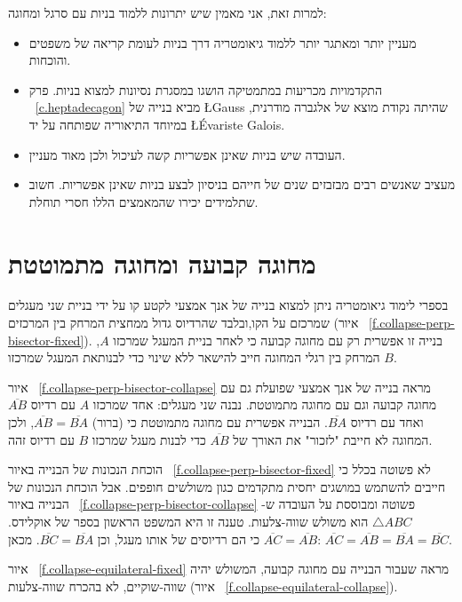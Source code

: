 למרות זאת, אני מאמין שיש יתרונות ללמוד בניות עם סרגל ומחוגה:
\begin{itemize}
\item
מעניין יותר ומאתגר יותר ללמוד גיאומטריה דרך בניות לעומת קריאה של משפטים והוכחות.
\item
התקדמויות מכריעות במתמטיקה הושגו במסגרת נסיונות למצוא בניות. פרק%
~\ref{c.heptadecagon}
מביא בנייה של 
\L{Gauss}
שהיתה נקודת מוצא של אלגברה מודרנית, במיוחד התיאוריה שפותחה על יד 
\L{\'{E}variste Galois}.
\item
העובדה שיש בניות שאינן אפשריות קשה לעיכול ולכן מאוד מעניין.
\item
מעציב שאנשים רבים מבזבזים שנים של חייהם בניסיון לבצע בניות שאינן אפשריות. חשוב שתלמידים יכירו שהמאמצים הללו חסרי תוחלת.
\end{itemize}



\section{מחוגה קבועה ומחוגה מתמוטטת}\label{s.collapse}

בספרי לימוד גיאומטריה ניתן למצוא בנייה של אנך אמצעי לקטע קו על ידי בניית שני מעגלים שמרכזם על הקו,ובלבד שהרדיוס גדול ממחצית המרחק בין המרכזים 
(איור%
~\ref{f.collapse-perp-bisector-fixed}).
בנייה זו אפשרית רק עם מחוגה קבועה כי לאחר בניית המעגל שמרכזו 
$A$,
המרחק בין רגלי המחוגה חייב להישאר ללא שינוי כדי לבנותאת המעגל שמרכזו 
$B$.

איור%
~\ref{f.collapse-perp-bisector-collapse}
מראה בנייה של אנך אמצעי שפועלת גם עם מחוגה קבועה וגם עם מחוגה מתמוטטת. נבנה שני מעגלים: אחד שמרכזו 
$A$
עם רדיוס
$\overline{AB}$
ואחד עם רדיוס
$\overline{BA}$.
הבנייה אפשרית עם מחוגה מתמוטטת כי (ברור)
$\overline{AB}=\overline{BA}$,
ולכן המחוגה לא חייבת "לזכור" את האורך של
$\overline{AB}$
כדי לבנות מעגל שמרכזו 
$B$
עם רדיוס זהה.

הוכחת הנכונות של הבנייה באיור%
~\ref{f.collapse-perp-bisector-fixed}
לא פשוטה בכלל כי חייבים להשתמש במושגים יחסית מתקדמים כגון משולשים חופפים. אבל הוכחת הנכונות של הבנייה באיור%
~\ref{f.collapse-perp-bisector-collapse}
פשוטה ומבוססת על העובדה ש-%
$\triangle ABC$
הוא משולש שווה-צלעות. טענה זו היא המשפט הראשון בספר של אוקלידס. 
$\overline{AC}=\overline{AB}$
כי הם רדיוסים של אותו מעגל, וכן
$\overline{BC}=\overline{BA}$.
מכאן:
$\overline{AC} = \overline{AB} = \overline{BA} = \overline{BC}$.

איור%
~\ref{f.collapse-equilateral-fixed}
מראה שעבור הבנייה עם מחוגה קבועה, המשולש יהיה שווה-שוקיים, לא בהכרח שווה-צלעות 
(איור~
\ref{f.collapse-equilateral-collapse}).

